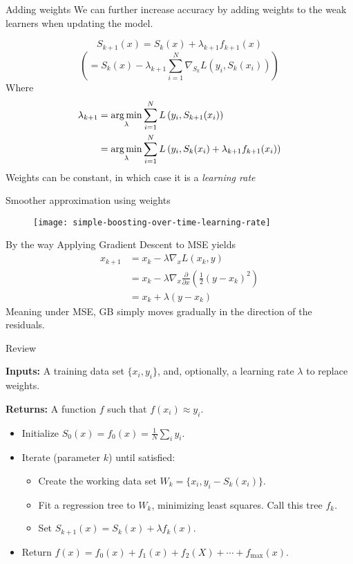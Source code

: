 \begin{frame}{Adding weights}
We can further increase accuracy by adding weights to the weak learners when updating the model. 

$$S_{k+1}(x) = S_k(x) + \lambda_{k+1} f_{k+1}(x)$$
$$\left ( = S_k(x) - \lambda_{k+1} \sum^N_{i=1} \nabla_{S_k} L(y_i, S_k(x_i)) \right )$$
Where
\begin{align*}
\lambda_{k+1} &= \operatorname*{arg\,min}_{\lambda} \sum^{N}_{i = 1}L\left(y_i, S_{k+1}(x_i)\right) \\
& =\operatorname*{arg\,min}_{\lambda} \sum^{N}_{i = 1}L\left(y_i, S_k(x_i) + \lambda_{k+1} f_{k+1}(x_i)\right)
\end{align*}
Weights can be constant, in which case it is a \emph{learning rate}
\end{frame}
%

\begin{frame}{Smoother approximation using weights}

  \begin{figure}
    \texttt{[image: simple-boosting-over-time-learning-rate]}
  \end{figure}

\end{frame}
%


\begin{frame}{By the way}
Applying Gradient Descent to MSE yields
\begin{align*}
x_{k+1} &= x_k - \lambda \nabla_x L(x_k, y) \\
&= x_k - \lambda \nabla_x \frac{\partial}{\partial x}\left(\frac{1}{2}(y - x_k)^2\right) \\
&= x_k + \lambda(y - x_k)
\end{align*}
Meaning under MSE, GB simply moves gradually in the direction of the residuals. 
\end{frame}
%

\begin{frame}{Review}

\textbf{Inputs:} A training data set $\{ x_i, y_i \}$, and, optionally, a learning rate $\lambda$ to replace weights.

\textbf{Returns:} A function $f$ such that $f(x_i) \approx y_i$.

\begin{itemize}
  \item Initialize $S_0(x) = f_0(x) = \frac{1}{N} \sum_i y_i$.
  \item Iterate (parameter $k$) until satisfied: \begin{itemize}
    \item Create the working data set $W_k = \{ x_i, y_i - S_{k}(x_i) \}$.
    \item Fit a regression tree to $W_k$, minimizing least squares.  Call this tree $f_k$.
    \item Set $S_{k+1}(x) = S_{k}(x) + \lambda f_{k}(x)$. 
  \end{itemize}
  \item Return $f(x) = f_0(x) + f_1(x) + f_2(X) + \cdots + f_{\text{max}}(x)$.
\end{itemize}

\end{frame}
%